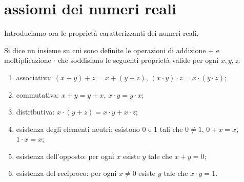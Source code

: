 \begin{comment}
Allora dato $u\in G$ con $u>0_G$ e dato $v\in H$
con $v>0_H$ esiste una unica funzione $f\colon G \to H$ tale che
\begin{gather}
  f(u) = v  \label{eq:49932}\\
  f(x+y) = f(x)+f(y) \label{eq:4882824}\\
  x\ge y \implies f(x) \ge f(y).
\end{gather}
Inoltre tale funzione $f$ risulta essere bigettiva
ed è dunque un isomorfismo delle due strutture.
\end{theorem}
%
\begin{proof}
Andremo a definire $f$ per gradi. Innanzitutto
dovrà essere $f(u)=v$ per soddisfare~\eqref{eq:49932}.
Poi dovrà essere $f(u+u) = f(u)+f(u) = v+v$,
$f(u+u+u) = f(u+u)+f(u) = v+v+v$
per soddisfare~\eqref{eq:4882824}.
In generale, dato $n\in \NN$ possiamo definire
i multipli $nx$ di un numero $x\in G$ con la seguente
definizione ricorsiva:
\[
 \begin{cases}
 0x = 0_G, \\
 (n+1) x = nx + x.
 \end{cases}
\]
....
\end{proof}
\end{comment}

\section{assiomi dei numeri reali}

Introduciamo ora le proprietà caratterizzanti dei numeri reali.

\begin{definition}[campo]\label{def:field}
\label{def:campo}%
Si dice 
un insieme su cui sono definite le operazioni di addizione $+$ e
moltiplicazione $\cdot$ che soddisfano le seguenti proprietà
valide per ogni $x,y,z$:
\begin{enumerate}
\item associativa: $(x+y)+z = x + (y+z)$, $(x\cdot y)\cdot z = x \cdot (y \cdot z)$;
\item commutativa: $x+y=y+x$, $x\cdot y = y \cdot x$;
\item distributiva: $x\cdot (y+z) = x\cdot y + x \cdot z$;
\item esistenza degli elementi neutri: esistono $0$ e $1$
tali che $0\neq 1$, $0+x = x$, $1\cdot x = x$;
\item esistenza dell'opposto: per ogni $x$ esiste $y$ tale che $x+y = 0$;
\item esistenza del reciproco: per ogni $x\neq 0$ esiste $y$ tale che $x \cdot y = 1$.
\end{enumerate}
\end{definition}

